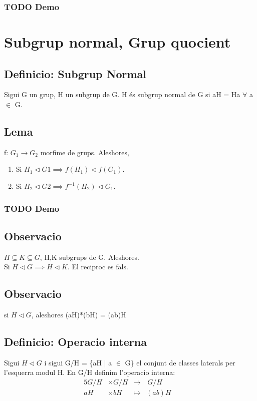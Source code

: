 \documentclass[11pt]{article}
\begin{document}
\subsubsection{{\bfseries\sffamily TODO} Demo}
\label{sec:orgf59f5f9}

\section{Subgrup normal, Grup quocient}
\label{sec:org35fe8d0}
\subsection{Definicio: Subgrup Normal}
\label{sec:org3519ded}
Sigui G un grup, H un subgrup de G. H és subgrup normal de G si aH = Ha \(\forall\) a \(\in\) G.
\subsection{Lema}
\label{sec:orgc970438}
f: \(G_1 \to G_2\) morfime de grups. Aleshores,
\begin{enumerate}
\item Si \(H_1 \vartriangleleft G1 \implies f(H_1) \vartriangleleft f(G_1)\).
\item Si \(H_2 \vartriangleleft G2 \implies f^{-1}(H_2) \vartriangleleft G_1\).
\end{enumerate}
\subsubsection{{\bfseries\sffamily TODO} Demo}
\label{sec:org03556a0}
\subsection{Observacio}
\label{sec:org177d011}
\(H \subseteq K \subseteq G\), H,K subgrups de G. Aleshores. \\
Si \(H \vartriangleleft G \implies H \vartriangleleft K\). El reciproc es fals.
\subsection{Observacio}
\label{sec:orgf5c36e5}
si \(H \vartriangleleft G\), aleshores (aH)*(bH) = (ab)H
\subsection{Definicio: Operacio interna}
\label{sec:org6bda7f8}
Sigui \(H \vartriangleleft G\) i sigui G/H = \{aH | a \(\in\) G\} el conjunt de classes laterals per l'esquerra modul H. En G/H definim l'operacio interna:
\begin{alignat*}{5}
G/H &\times G/H &\to&\hspace{2pt}  G/H & \\
aH &\times bH &\mapsto&  (ab)H &
\end{alignat*}
\end{document}

